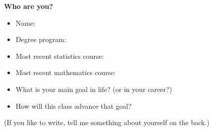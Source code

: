 \documentclass[14pt]{extarticle}
\begin{document}
\centerline{\bf\large Who are you?}
\begin{itemize}
\item Name:
\item Degree program:
\item Most recent statistics course:
\vspace{1.25in}
\item Most recent mathematics course:
\vspace{1.25in}
\item What is your main goal in life? (or in your career?)
\vspace{2.25in}
\item How will this class advance that goal?
\vspace{2.25in}
\end{itemize}
(If you like to write, tell me something about yourself on the back.)
\end{document}
